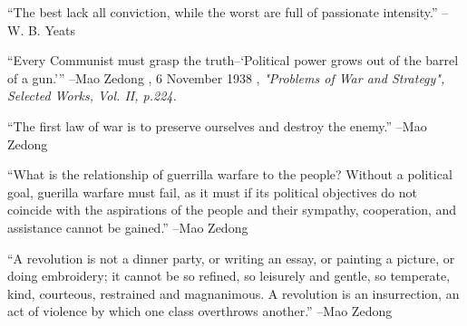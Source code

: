 \documentclass{article}%
\begin{document}
\vspace{1mm}%
\begin{minipage}{\textwidth}%
\flushleft%
“The best lack all conviction, while the worst are full of passionate intensity.”%
\linebreak%
\vspace{1mm}%
–W. B. Yeats%
\linebreak%
\vspace{1mm}%
\end{minipage}%
\linebreak%
\vspace{1mm}%
\begin{minipage}{\textwidth}%
\flushleft%
“Every Communist must grasp the truth–‘Political power grows out of the barrel of a gun.’”%
\linebreak%
\vspace{1mm}%
–Mao Zedong%
, 6 November 1938%
, \textit{"Problems of War and Strategy", Selected Works, Vol. II, p.224.}%
\linebreak%
\vspace{1mm}%
\end{minipage}%
\linebreak%
\vspace{1mm}%
\begin{minipage}{\textwidth}%
\flushleft%
“The first law of war is to preserve ourselves and destroy the enemy.”%
\linebreak%
\vspace{1mm}%
–Mao Zedong%
\linebreak%
\vspace{1mm}%
\end{minipage}%
\linebreak%
\vspace{1mm}%
\begin{minipage}{\textwidth}%
\flushleft%
“What is the relationship of guerrilla warfare to the people? Without a political goal, guerilla warfare must fail, as it must if its political objectives do not coincide with the aspirations of the people and their sympathy, cooperation, and assistance cannot be gained.”%
\linebreak%
\vspace{1mm}%
–Mao Zedong%
\linebreak%
\vspace{1mm}%
\end{minipage}%
\linebreak%
\vspace{1mm}%
\begin{minipage}{\textwidth}%
\flushleft%
“A revolution is not a dinner party, or writing an essay, or painting a picture, or doing embroidery; it cannot be so refined, so leisurely and gentle, so temperate, kind, courteous, restrained and magnanimous. A revolution is an insurrection, an act of violence by which one class overthrows another.”%
\linebreak%
\vspace{1mm}%
–Mao Zedong%
\linebreak%
\vspace{1mm}%
\end{minipage}%
\end{document}
